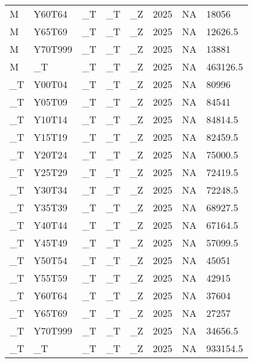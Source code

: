 \begin{longtable}[t]{llllllll}
M & Y60T64 & \_T & \_T & \_Z & 2025 & NA & 18056\\
M & Y65T69 & \_T & \_T & \_Z & 2025 & NA & 12626.5\\
M & Y70T999 & \_T & \_T & \_Z & 2025 & NA & 13881\\
\addlinespace
M & \_T & \_T & \_T & \_Z & 2025 & NA & 463126.5\\
\_T & Y00T04 & \_T & \_T & \_Z & 2025 & NA & 80996\\
\_T & Y05T09 & \_T & \_T & \_Z & 2025 & NA & 84541\\
\_T & Y10T14 & \_T & \_T & \_Z & 2025 & NA & 84814.5\\
\_T & Y15T19 & \_T & \_T & \_Z & 2025 & NA & 82459.5\\
\addlinespace
\_T & Y20T24 & \_T & \_T & \_Z & 2025 & NA & 75000.5\\
\_T & Y25T29 & \_T & \_T & \_Z & 2025 & NA & 72419.5\\
\_T & Y30T34 & \_T & \_T & \_Z & 2025 & NA & 72248.5\\
\_T & Y35T39 & \_T & \_T & \_Z & 2025 & NA & 68927.5\\
\_T & Y40T44 & \_T & \_T & \_Z & 2025 & NA & 67164.5\\
\addlinespace
\_T & Y45T49 & \_T & \_T & \_Z & 2025 & NA & 57099.5\\
\_T & Y50T54 & \_T & \_T & \_Z & 2025 & NA & 45051\\
\_T & Y55T59 & \_T & \_T & \_Z & 2025 & NA & 42915\\
\_T & Y60T64 & \_T & \_T & \_Z & 2025 & NA & 37604\\
\_T & Y65T69 & \_T & \_T & \_Z & 2025 & NA & 27257\\
\addlinespace
\_T & Y70T999 & \_T & \_T & \_Z & 2025 & NA & 34656.5\\
\_T & \_T & \_T & \_T & \_Z & 2025 & NA & 933154.5\\*
\end{longtable}

